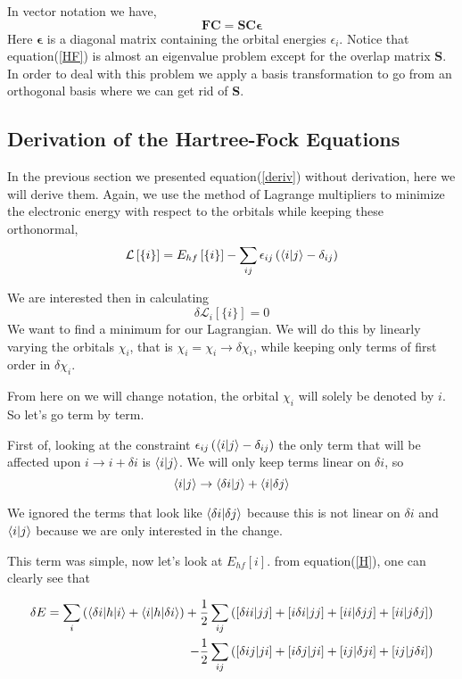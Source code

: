 \documentclass[a4paper]{article}
\begin{document}
In vector notation we have,
\begin{equation} \label{HF}
\boldsymbol{FC} = \boldsymbol{SC\epsilon}
\end{equation}
Here $\boldsymbol{\epsilon}$ is a diagonal matrix containing the orbital energies $\epsilon_i$.
Notice that equation(\ref{HF}) is almost an eigenvalue problem except for the overlap matrix \textbf{S}.
In order to deal with this problem we apply a basis transformation to go from an orthogonal basis where we can get rid of \textbf{S}.


\subsection{Derivation of the Hartree-Fock Equations}
In the previous section we presented equation(\ref{deriv}) without derivation, here we will derive them.
Again, we use the method of Lagrange multipliers to minimize the electronic energy with respect to the orbitals while keeping these orthonormal,
$$
\mathcal{L} \left[ \{ i \}\right] =  E_{hf} \left[\{i\}\right] - \sum_{ij} \epsilon_{ij} \left(\braket{i | j} - \delta_{ij} \right)
$$

We are interested then in calculating
$$
\delta \mathcal{L}_i \left[ \{i\} \right] = 0
$$
We want to find a minimum for our Lagrangian. 
We will do this by linearly varying the orbitals $\chi_i$, that is $\chi_i = \chi_i \rightarrow \delta\chi_i$, while keeping only terms of first order in $\delta\chi_i$.

From here on we will change notation, the orbital $\chi_i$ will solely be denoted by $i$.
So let's go term by term.

First of, looking at the constraint $\epsilon_{ij} \left(\braket{i | j} - \delta_{ij} \right)$ the only term that will be affected upon $i \rightarrow i + \delta i $ is $\braket{i | j}$.
We will only keep terms linear on $\delta i$, so
\begin{equation}\label{d2}
\braket{i | j} \rightarrow \braket{\delta i | j} + \braket{i | \delta j}
\end{equation}

We ignored the terms that look like $\braket{\delta i | \delta j}$ because this is not linear on $\delta i$ and $\braket{ i | j}$ because we are only interested in the change.

This term was simple, now let's look at $E_{hf} [{i}]$.
from equation(\ref{H}), one can clearly see that

\begin{equation}\label{d1}
\begin{split}
\delta E = \sum_i \left( \braket{\delta i | h | i} + \braket{i|h|\delta i} \right) +
\frac{1}{2}\sum_{ij} \left( [\delta i i | jj] + [i \delta i | jj] + [i i |\delta jj] + [ii | j\delta j]\right)\\
 - \frac{1}{2}\sum_{ij} \left( [\delta i j | ji] + [i \delta j | ji] + [i j |\delta ji] + [ij | j\delta i]\right)
\end{split}
\end{equation}
\end{document}
